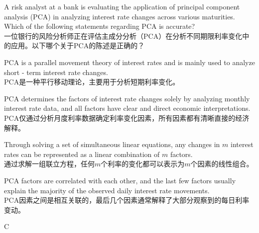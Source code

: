 \documentclass{article}
\newcounter{question} %
\begin{document}
\begin{question}
    A risk analyst at a bank is evaluating the application of principal component analysis (PCA) in analyzing interest rate changes across various maturities. Which of the following statements regarding PCA is accurate?
    \\一位银行的风险分析师正在评估主成分分析（PCA）在分析不同期限利率变化中的应用。以下哪个关于PCA的陈述是正确的？
    \end{question}
    
    \begin{choices}
        \item PCA is a parallel movement theory of interest rates and is mainly used to analyze short - term interest rate changes.\\
        PCA是一种平行移动理论，主要用于分析短期利率变化。
        \item PCA determines the factors of interest rate changes solely by analyzing monthly interest rate data, and all factors have clear and direct economic interpretations.\\
        PCA仅通过分析月度利率数据确定利率变化因素，所有因素都有清晰直接的经济解释。
        \item Through solving a set of simultaneous linear equations, any changes in \(m\) interest rates can be represented as a linear combination of \(m\) factors.\\
        通过求解一组联立方程，任何\(m\)个利率的变化都可以表示为\(m\)个因素的线性组合。
        \item PCA factors are correlated with each other, and the last few factors usually explain the majority of the observed daily interest rate movements.\\
        PCA因素之间是相互关联的，最后几个因素通常解释了大部分观察到的每日利率变动。
    \end{choices}
    
    \begin{correctanswer}
    C
    \end{correctanswer}
    
\end{document}
